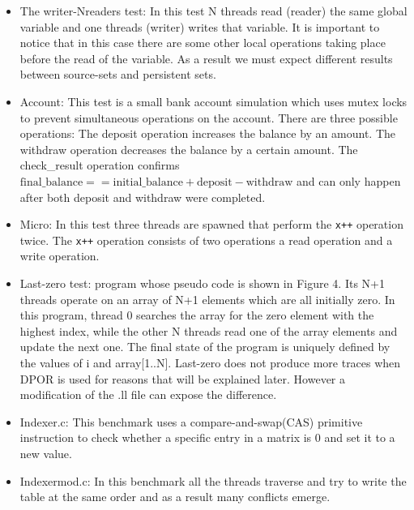 \begin{itemize}
\item The writer-Nreaders test: In this test N threads read (reader) the same global variable and one threads (writer) writes that variable. It is important 
to notice that in this case there are some other local operations taking place before the read of the variable. As a result we must expect different results between 
source-sets and persistent sets.

\item Account: This test is a small bank account simulation which uses mutex locks to prevent simultaneous operations on the account.
There are three possible operations: The deposit operation increases the balance by an amount. The withdraw operation decreases the balance by a certain amount. The check\_result operation confirms 
$\text{final\_balance} == \text{initial\_balance} + \text{deposit} - \text{withdraw}$ and can only happen after both deposit and withdraw were completed.

\item Micro: In this test three threads are spawned that perform the \verb|x++| operation twice. The \verb|x++| operation
consists of two operations a read operation and a write operation.

\item Last-zero test: program whose pseudo code is shown in Figure 4. Its N+1 threads operate on an array of
N+1 elements which are all initially zero. In this program, thread 0
searches the array for the zero element with the highest index, while
the other N threads read one of the array elements and update the
next one. The final state of the program is uniquely defined by the
values of i and array[1..N]. Last-zero does not produce more traces when DPOR is used for reasons
that will be explained later. However a modification of the .ll file can expose the difference.

\item Indexer.c: This benchmark uses a compare-and-swap(CAS) primitive instruction to check
whether a specific entry in a matrix is 0 and set it to a new
value. 

\item Indexermod.c: In this benchmark all the threads traverse and try to write the table at the same
order and as a result many conflicts emerge.

\end{itemize}

